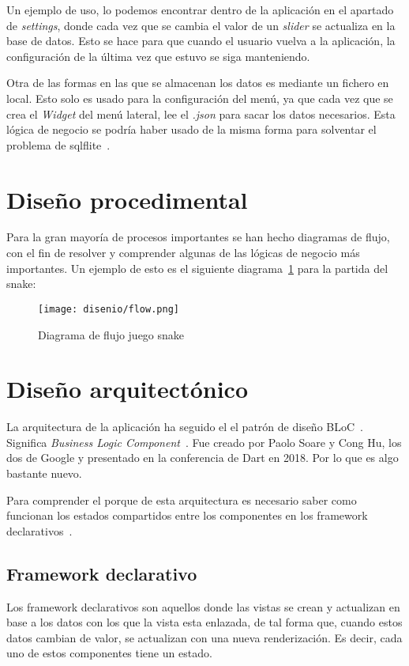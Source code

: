 \begin{itemize}
	Un ejemplo de uso, lo podemos encontrar dentro de la aplicación en el apartado de \emph{settings}, donde cada vez que se cambia el valor de un \emph{slider} se actualiza en la base de datos. Esto se hace para que cuando el usuario vuelva a la aplicación, la configuración de la última vez que estuvo se siga manteniendo.
	
\end{itemize}

Otra de las formas en las que se almacenan los datos es mediante un fichero en local. Esto solo es usado para la configuración del menú, ya que cada vez que se crea el \emph{Widget} del menú lateral, lee el \emph{.json} para sacar los datos necesarios. Esta lógica de negocio se podría haber usado de la misma forma para solventar el problema de sqlflite~\pageref{sqlflite}.

\section{Diseño procedimental}
Para la gran mayoría de procesos importantes se han hecho diagramas de flujo, con el fin de resolver y comprender algunas de las lógicas de negocio más importantes. Un ejemplo de esto es el siguiente diagrama~\ref{fig:snakediagrama} para la partida del snake:

	\begin{figure}[H]
		\centering
		\texttt{[image: disenio/flow.png]}
		\caption{Diagrama de flujo juego snake}\label{fig:snakediagrama}
	\end{figure}

\section{Diseño arquitectónico}
La arquitectura de la aplicación ha seguido el el patrón de diseño BLoC~\cite{xurxodev:bloc}. Significa \emph{Business Logic Component}~\pageref{bloc}. Fue creado por Paolo Soare y Cong Hu, los dos de Google y presentado en la conferencia de Dart en 2018. Por lo que es algo bastante nuevo.

Para comprender el porque de esta arquitectura es necesario saber como funcionan los estados compartidos entre los componentes en los framework declarativos~\pageref{declarativo}.

\subsection{Framework declarativo}\label{declarativo}
Los framework declarativos son aquellos donde las vistas se crean y actualizan en base a los datos con los que la vista esta enlazada, de tal forma que, cuando estos datos cambian de valor, se actualizan con una nueva renderización. Es decir, cada uno de estos componentes tiene un estado.

